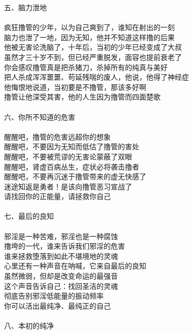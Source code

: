 \begin{poem}
\begin{adjustwidth}{-4em}{-4em}
\begin{multicols}{2}
            五、脑力泄地 \\~\\
            疯狂撸管的少年，以为自己爽到了，谁知在射出的一刻 \\ 脑力也泄了一地，因为无知，他并不知道这样撸的后果 \\ 他被无害论洗脑了，十年后，当初的少年已经变成了大叔 \\ 虽然才三十岁不到，但已经严重脱发，面容也提前衰老了 \\ 你会感叹撸管真是把杀猪刀，杀掉所有的纯真与美好 \\ 把人杀成浑浑噩噩、苟延残喘的废人，他说，他得了神经症 \\ 他悔恨地说道，当初要是不撸管，那该多好啊 \\ 撸管让他深受其害，他的人生因为撸管而四面楚歌 \\~\\
            六、你所不知道的危害 \\~\\
            醒醒吧，撸管的危害远超你的想象 \\ 醒醒吧，不要因为无知而低估了撸管的害处 \\ 醒醒吧，不要被荒谬的无害论蒙蔽了双眼 \\ 醒醒吧，肾虚百病丛生，症状必将袭击撸者 \\ 醒醒吧，不要再沉迷于撸管带来的虚无快感了 \\ 迷途知返是勇者！是该向撸管恶习宣战了 \\ 请找回你的正能量，请拯救你自己 \\~\\
            七、最后的良知 \\~\\
            邪淫是一种苦难，邪淫也是一种腐蚀 \\ 撸垮的一代，谁来告诉我们邪淫的危害 \\ 谁来拯救堕落到如此不堪境地的灵魂 \\ 心里还有一种声音在呐喊，它来自最后的良知 \\ 虽然微弱，但却是改变命运的最强音 \\ 这个声音告诉自己：找回圣洁的灵魂 \\ 彻底告别邪淫低能量的振动频率 \\ 你可以活出最纯净、最纯正的自己 \\~\\
            八、本初的纯净 \\~\\

\end{multicols}
\end{adjustwidth}
\end{poem}
